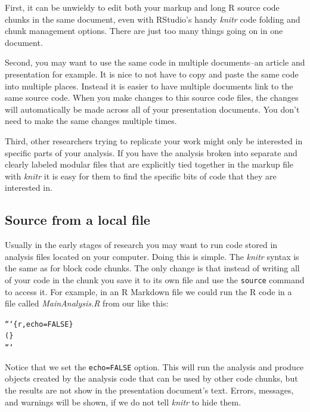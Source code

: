 First, it can be unwieldy to edit both your markup and long R source code chunks in the same document, even with RStudio's handy {\emph{knitr}} code folding and chunk management options. There are just too many things going on in one document. 

Second, you may want to use the same code in multiple documents--an article and presentation for example. It is nice to not have to copy and paste the same code into multiple places. Instead it is easier to have multiple documents link to the same source code. When you make changes to this source code files, the changes will automatically be made across all of your presentation documents. You don't need to make the same changes multiple times.

Third, other researchers trying to replicate your work might only be interested in specific parts of your analysis. If you have the analysis broken into separate and clearly labeled modular files that are explicitly tied together in the markup file with {\emph{knitr}} it is easy for them to find the specific bits of code that they are interested in.

\subsection{Source from a local file}

Usually in the early stages of research you may want to run code stored in analysis files located on your computer. Doing this is simple. The {\emph{knitr}} syntax is the same as for block code chunks. The only change is that instead of writing all of your code in the chunk you save it to its own file and use the \texttt{source} command to access it. For example, in an R Markdown file we could run the R code in a file called {\emph{MainAnalysis.R}} from our {} like this:

\begin{knitrout}
\color{fgcolor}\begin{kframe}
\begin{alltt}
```\{r, echo=FALSE\}
(\}
```
\end{alltt}
\end{kframe}
\end{knitrout}


Notice that we set the \texttt{echo=FALSE} option. This will run the analysis and produce objects created by the analysis code that can be used by other code chunks, but the results are not show in the presentation document's text. Errors, messages, and warnings will be shown, if we do not tell {\emph{knitr}} to hide them.

